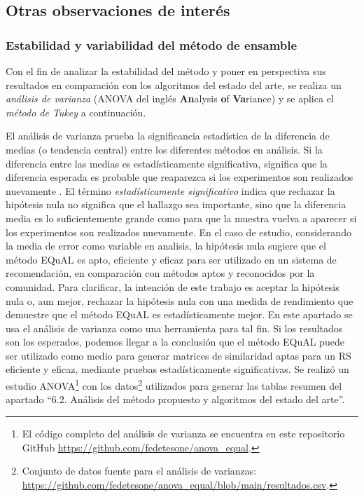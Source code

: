 \subsection{Otras observaciones de interés}

\subsubsection{Estabilidad y variabilidad del método de ensamble}

Con el fin de analizar la estabilidad del método y poner en perspectiva sus resultados en comparación con los algoritmos del estado del arte, se realiza un \textit{análisis de varianza} (ANOVA del inglés \textbf{An}alysis \textbf{o}f \textbf{Va}riance) y se aplica el \textit{método de Tukey} a continuación.

\bigskip El análisis de varianza prueba la significancia estadística de la diferencia de medias (o tendencia central) entre los diferentes métodos en análisis. Si la diferencia entre las medias es estadísticamente significativa, significa que la diferencia esperada es probable que reaparezca si los experimentos son realizados nuevamente \citep{tabachnick2007experimental}. El término \textit{estadísticamente significativo} indica que rechazar la hipótesis nula no significa que el hallazgo sea importante, sino que la diferencia media es lo suficientemente grande como para que la muestra vuelva a aparecer si los experimentos son realizados nuevamente. En el caso de estudio, considerando la media de error como variable en analisis, la hipótesis nula sugiere que el método EQuAL es apto, eficiente y eficaz para ser utilizado en un sistema de recomendación, en comparación con métodos aptos y reconocidos por la comunidad. Para clarificar, la intención de este trabajo es aceptar la hipótesis nula o, aun mejor, rechazar la hipótesis nula con una medida de rendimiento que demuestre que el método EQuAL es estadísticamente mejor. En este apartado se usa el análisis de varianza como una herramienta para tal fin. Si los resultados son los esperados, podemos llegar a la conclusión que el método EQuAL puede ser utilizado como medio para generar matrices de similaridad aptas para un RS eficiente y eficaz, mediante pruebas estadísticamente significativas. Se realizó un estudio ANOVA\footnote{El código completo del análisis de varianza se encuentra en este repositorio GitHub \url{https://github.com/fedetesone/anova_equal}.} con los datos\footnote{Conjunto de datos fuente para el análisis de varianzas: \url{https://github.com/fedetesone/anova_equal/blob/main/resultados.csv}.} utilizados para generar las tablas resumen del apartado “6.2. Análisis del método propuesto y algoritmos del estado del arte”.

